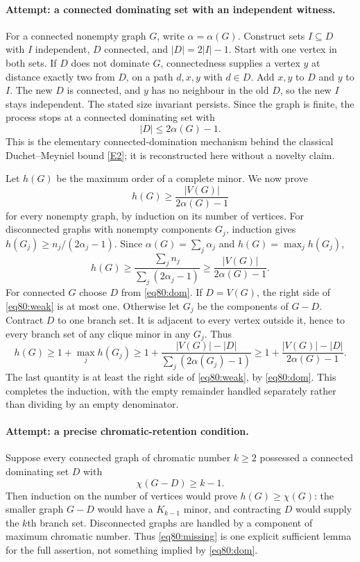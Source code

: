 \documentclass[11pt,a4paper]{article}
\numberwithin{equation}{section}
\newcommand{\eref}[2]{\hyperlink{extra:#1:#2}{[E#2]}}
\begin{document}
\paragraph{Attempt: a connected dominating set with an independent witness.}
For a connected nonempty graph $G$, write $\alpha=\alpha(G)$. Construct
sets $I\subseteq D$ with $I$ independent, $D$ connected, and
$|D|=2|I|-1$. Start with one vertex in both sets. If $D$ does not dominate
$G$, connectedness supplies a vertex $y$ at distance exactly two from
$D$, on a path $d,x,y$ with $d\in D$. Add $x,y$ to $D$ and $y$ to $I$.
The new $D$ is connected, and $y$ has no neighbour in the old $D$, so the
new $I$ stays independent. The stated size invariant persists. Since the
graph is finite, the process stops at a connected dominating set with
\begin{equation}\label{eq80:dom}
 |D|\leq2\alpha(G)-1.
\end{equation}
This is the elementary connected-domination mechanism behind the classical
Duchet--Meyniel bound \eref{statement}{2}; it is reconstructed here without a
novelty claim.

Let $h(G)$ be the maximum order of a complete minor. We now prove
\begin{equation}\label{eq80:weak}
 h(G)\geq\frac{|V(G)|}{2\alpha(G)-1}
\end{equation}
for every nonempty graph, by induction on its number of vertices.
For disconnected graphs with nonempty components $G_j$, induction gives
$h(G_j)\geq n_j/(2\alpha_j-1)$. Since
$\alpha(G)=\sum_j\alpha_j$ and $h(G)=\max_jh(G_j)$,
\[
 h(G)\geq\frac{\sum_j n_j}{\sum_j(2\alpha_j-1)}
       \geq\frac{|V(G)|}{2\alpha(G)-1}.
\]
For connected $G$ choose $D$ from \eqref{eq80:dom}. If $D=V(G)$, the
right side of \eqref{eq80:weak} is at most one. Otherwise let $G_j$ be
the components of $G-D$. Contract $D$ to one branch set. It is adjacent
to every vertex outside it, hence to every branch set of any clique minor
in any $G_j$. Thus
\[
 h(G)\geq1+\max_jh(G_j)
 \geq1+\frac{|V(G)|-|D|}{\sum_j(2\alpha(G_j)-1)}
 \geq1+\frac{|V(G)|-|D|}{2\alpha(G)-1}.
\]
The last quantity is at least the right side of \eqref{eq80:weak}, by
\eqref{eq80:dom}. This completes the induction, with the empty remainder
handled separately rather than dividing by an empty denominator.

\paragraph{Attempt: a precise chromatic-retention condition.}
Suppose every connected graph of chromatic number $k\geq2$ possessed a
connected dominating set $D$ with
\begin{equation}\label{eq80:missing}
 \chi(G-D)\geq k-1.
\end{equation}
Then induction on the number of vertices would prove $h(G)\geq\chi(G)$:
the smaller graph $G-D$ would have a $K_{k-1}$ minor, and contracting $D$
would supply the $k$th branch set. Disconnected graphs are handled by a
component of maximum chromatic number. Thus \eqref{eq80:missing} is one
explicit sufficient lemma for the full assertion, not something implied
by \eqref{eq80:dom}.
\end{document}
